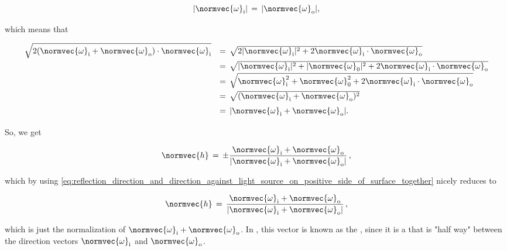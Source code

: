 {\begin{equation}
|\normvec{\omega}_{\text{i}}| \,=\, |\normvec{\omega}_{\text{o}}|,
\end{equation}

which means that

\begin{equation}
\renewcommand*{\arraystretch}{1.5}
\begin{array}{rl}
\displaystyle \sqrt{2(\normvec{\omega}_{\text{i}} + \normvec{\omega}_{\text{o}})\cdot\normvec{\omega}_{\text{i}}} & =\, \sqrt{2|\normvec{\omega}_{\text{i}}|^2 + 2\normvec{\omega}_{\text{i}}\cdot \normvec{\omega}_{\text{o}}} \\
\displaystyle & =\, \sqrt{|\normvec{\omega}_{\text{i}}|^2 + |\normvec{\omega}_{\text{0}}|^2 + 2\normvec{\omega}_{\text{i}}\cdot \normvec{\omega}_{\text{o}}} \\
\displaystyle & =\, \sqrt{\normvec{\omega}_{\text{i}}^2 + \normvec{\omega}_{\text{0}}^2 + 2\normvec{\omega}_{\text{i}}\cdot \normvec{\omega}_{\text{o}}} \\
\displaystyle & =\, \sqrt{(\normvec{\omega}_{\text{i}}+\normvec{\omega}_{\text{o}})^2} \\
\displaystyle & =\, |\normvec{\omega}_{\text{i}}+\normvec{\omega}_{\text{o}}|.
\end{array}
\end{equation}

So, we get

\begin{equation} \label{eq:halfway_vector_two_alternatives}
\normvec{h} \,=\, \pm\frac{\normvec{\omega}_{\text{i}} + \normvec{\omega}_{\text{o}}}{|\normvec{\omega}_{\text{i}}+\normvec{\omega}_{\text{o}}|}\,,
\end{equation}

which by using \eqref{eq:reflection_direction_and_direction_against_light_source_on_positive_side_of_surface_together} nicely reduces to

\begin{equation} \label{eq:halfway_vector_final}
\normvec{h} \,=\, \frac{\normvec{\omega}_{\text{i}} + \normvec{\omega}_{\text{o}}}{|\normvec{\omega}_{\text{i}}+\normvec{\omega}_{\text{o}}|}\,,
\end{equation}

which is just the normalization of $\normvec{\omega}_{\text{i}}+\normvec{\omega}_{\text{o}}$. In , this vector is known as the , since it is a  that is "half way" between the direction vectors $\normvec{\omega}_{\text{i}}$ and $\normvec{\omega}_{\text{o}}$.

}
